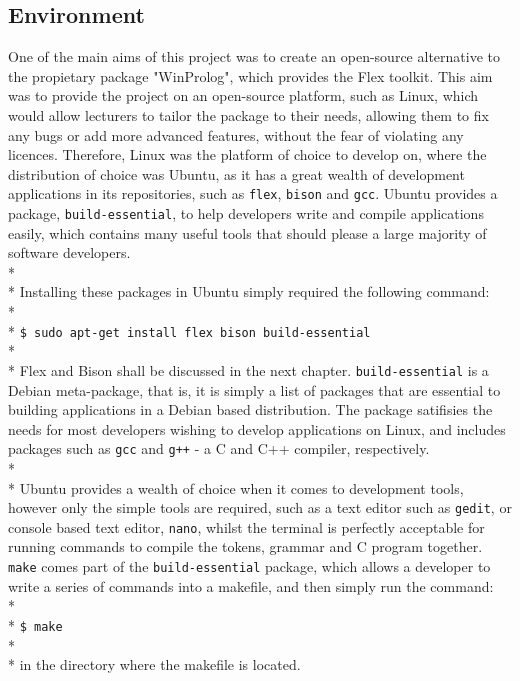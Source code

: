 \documentclass[12pt]{report}
\begin{document}
\subsection{Environment}\label{subsec:dev_environment}
One of the main aims of this project was to create an open-source alternative to the propietary package "WinProlog", which provides the Flex toolkit.  This aim was to provide the project on an open-source platform, such as Linux, which would allow lecturers to tailor the package to their needs, allowing them to fix any bugs or add more advanced features, without the fear of violating any licences.  Therefore, Linux was the platform of choice to develop on, where the distribution of choice was Ubuntu, as it has a great wealth of development applications in its repositories, such as \texttt{flex}, \texttt{bison} and \texttt{gcc}.  Ubuntu provides a package, \texttt{build-essential}, to help developers write and compile applications easily, which contains many useful tools that should please a large majority of software developers.\\*
\\*
Installing these packages in Ubuntu simply required the following command:
\\*
\\*
\texttt{\$ sudo apt-get install flex bison build-essential}
\\*
\\*
Flex and Bison shall be discussed in the next chapter.  \texttt{build-essential} is a Debian meta-package, that is, it is simply a list of packages that are essential to building applications in a Debian based distribution.  The package satifisies the needs for most developers wishing to develop applications on Linux, and includes packages such as \texttt{gcc} and \texttt{g++} - a C and C++ compiler, respectively.
\\*
\\*
Ubuntu provides a wealth of choice when it comes to development tools, however only the simple tools are required, such as a text editor such as \texttt{gedit}, or console based text editor, \texttt{nano}, whilst the terminal is perfectly acceptable for running commands to compile the tokens, grammar and C program together.  \texttt{make} comes part of the \texttt{build-essential} package, which allows a developer to write a series of commands into a makefile, and then simply run the command:\\*\\*
\texttt{\$ make}
\\*
\\*
in the directory where the makefile is located.
\end{document}
